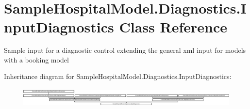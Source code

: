 \hypertarget{class_sample_hospital_model_1_1_diagnostics_1_1_input_diagnostics}{}\section{Sample\+Hospital\+Model.\+Diagnostics.\+Input\+Diagnostics Class Reference}
\label{class_sample_hospital_model_1_1_diagnostics_1_1_input_diagnostics}


Sample input for a diagnostic control extending the general xml input for models with a booking model  


Inheritance diagram for Sample\+Hospital\+Model.\+Diagnostics.\+Input\+Diagnostics\+:\begin{figure}[H]
\begin{center}
\leavevmode
\includegraphics[height=1.040892cm]{class_sample_hospital_model_1_1_diagnostics_1_1_input_diagnostics}
\end{center}
\end{figure}
